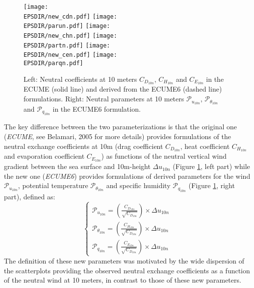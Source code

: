

\begin{figure}
 \centering\texttt{[image: \\EPSDIR/new\_cdn.pdf]}
 \centering\texttt{[image: \\EPSDIR/parun.pdf]}
 \centering\texttt{[image: \\EPSDIR/new\_chn.pdf]}
 \centering\texttt{[image: \\EPSDIR/partn.pdf]}
 \centering\texttt{[image: \\EPSDIR/new\_cen.pdf]}
 \centering\texttt{[image: \\EPSDIR/parqn.pdf]}
	\caption{Left: Neutral coefficients at 10 meters $C_{D_{10n}}$, $C_{H_{10n}}$ and $C_{E_{10n}}$ in the ECUME 
	(solid line) and derived from the ECUME6 (dashed line) formulations. 
	Right: Neutral parameters at 10 meters $\mathcal{P}_{u_{10n}}$, $\mathcal{P}_{{\theta}_{10n}}$ and $\mathcal{P}_{q_{10n}}$ 
	in the ECUME6 formulation.\label{ecume_coef}}
\end{figure}

The key difference between the two parameterizations is that the original one (\textit{ECUME}, see Belamari, 2005 %
for more details) provides formulations
of the neutral exchange coefficients at 10m (drag coefficient $C_{D_{10n}}$, heat coefficient $C_{H_{10n}}$ and 
evaporation coefficient $C_{E_{10n}}$) as functions of the neutral vertical wind gradient between the sea surface and 
10m-height $\Delta u_{10n}$ 
(Figure \ref{ecume_coef}, left part) while the new one (\textit{ECUME6}) provides formulations of derived parameters for the wind
$\mathcal{P}_{u_{10n}}$, potential temperature $\mathcal{P}_{{\theta}_{10n}}$ and specific humidity $\mathcal{P}_{q_{10n}}$
(Figure \ref{ecume_coef}, right part), defined as:
\begin{equation}
\left\{
\begin{array}{l}
	\mathcal{P}_{u_{10n}}=\left(\frac{C_{D_{10n}}}{\sqrt{C_{D_{10n}}}}\right)\times \Delta u_{10n} \\
	\mathcal{P}_{{\theta}_{10n}}=\left(\frac{C_{H_{10n}}}{\sqrt{C_{D_{10n}}}}\right)\times \Delta u_{10n} \\
	\mathcal{P}_{q_{10n}}=\left(\frac{C_{E_{10n}}}{\sqrt{C_{D_{10n}}}}\right)\times \Delta u_{10n} 
\end{array}
\right.
\end{equation}
The definition of these new parameters was motivated by the wide dispersion of the scatterplots providing the observed 
neutral exchange coefficients as a function of the neutral wind at 10 meters, in contrast to those of these new
parameters.\\

